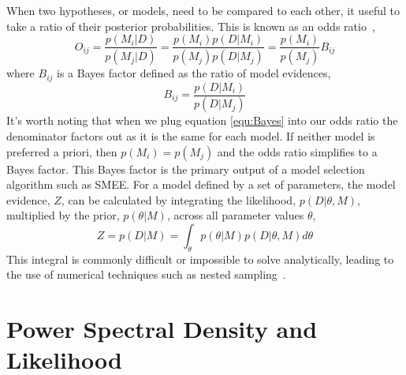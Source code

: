 When two hypotheses, or models, need to be compared to each other, it useful to take a ratio of their posterior probabilities. This is known as an odds ratio~\cite{thesis_josh, thesis_jade},
\begin{equation}
\label{equ:Odds}
    O_{ij} = \frac{p(M_{i}|D)}{p(M_{j}|D)} = \frac{p(M_{i})p(D|M_{i})}{p(M_{j})p(D|M_{j})} = \frac{p(M_{i})}{p(M_{j})}B_{ij}
\end{equation}
where $B_{ij}$ is a Bayes factor defined as the ratio of model evidences,
\begin{equation}
    B_{ij} = \frac{p(D|M_{i})}{p(D|M_{j})}
\end{equation}
It's worth noting that when we plug equation \ref{equ:Bayes} into our odds ratio the denominator factors out as it is the same for each model. If neither model is preferred a priori, then $p(M_{i}) = p(M_{j})$ and the odds ratio simplifies to a Bayes factor. This Bayes factor is the primary output of a model selection algorithm such as SMEE. For a model defined by a set of parameters, the model evidence, $Z$, can be calculated by integrating the likelihood, $p(D|\theta,M)$, multiplied by the prior, $p(\theta|M)$, across all parameter values $\theta$,
\begin{equation}
\label{equ:evidence_def}
    Z = p(D|M) = \int_{\theta} p(\theta|M)p(D|\theta,M)d\theta
\end{equation}
This integral is commonly difficult or impossible to solve analytically, leading to the use of numerical techniques such as nested sampling~\cite{thesis_josh, thesis_jade, logue:12, powell:16b, 2017PhRvD..96l3013P}.

\section{Power Spectral Density and Likelihood}

